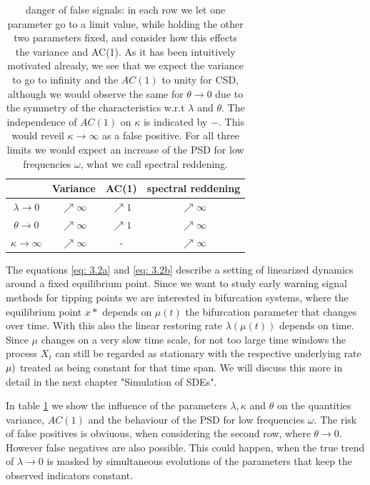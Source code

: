 \documentclass[%
thesis=student,%
coverpage=false,%
titlepage=false,%
headmarks=true, %
german,%
font=libertine, %
math=newpxtx, %
BCOR=5mm,%
coverBCOR=11mm%
]{tumbook}
\begin{document}
\begin{table}[h!]
\centering
\begin{tabular}{|c|c|c|c|}
\hline
& Variance & AC(1) & spectral reddening\\
\hline
$\lambda \rightarrow 0$ & $\nearrow \infty$ & $\nearrow 1$ & $\nearrow \infty$\\
$\theta \rightarrow 0$  & $\nearrow \infty$ & $\nearrow 1$ & $\nearrow \infty$\\
$\kappa \rightarrow \infty$ & $\nearrow \infty$ & - & $\nearrow \infty$\\    
\hline
\end{tabular}
\caption{danger of false signals: in each row we let one parameter go to a limit value, while holding the other two parameters fixed, and consider how this effects the variance and AC(1). As it has been intuitively motivated already, we see that we expect the variance to go to infinity and the $AC(1)$ to unity for CSD, although we would observe the same for $\theta \rightarrow 0$ due to the symmetry of the characteristics w.r.t $\lambda$ and $\theta$. The independence of $AC(1)$ on $\kappa$ is indicated by $-$. This would reveil $\kappa \rightarrow \infty$ as a false positive. For all three limits we would expect an increase of the PSD for low frequencies $\omega$, what we call spectral reddening.}
\label{tab:danger_of_false_signals}
\end{table}

The equations \ref{eq: 3.2a} and \ref{eq: 3.2b} describe a setting of linearized dynamics around a fixed equilibrium point. Since we want to study early warning signal methods for tipping points we are interested in bifurcation systems, where the equilibrium point $x*$ depends on $\mu(t)$ the bifurcation parameter that changes over time. With this also the linear restoring rate $\lambda(\mu(t))$ depends on time. Since $\mu$ changes on a very slow time scale, for not too large time windows the process $X_{t}$ can still be regarded as stationary with the respective underlying rate $\label(\mu)$ treated as being constant for that time span. We will discuss this more in detail in the next chapter "Simulation of SDEs".

In table \ref{tab:danger_of_false_signals} we show the influence of the parameters $\lambda, \kappa$ and $\theta$ on the quantities variance, $AC(1)$ and the behaviour of the PSD for low frequencies $\omega$. The risk of false positives is obviuous, when considering the second row, where $\theta \rightarrow 0$. However false negatives are also possible. This could happen, when the true trend of $\lambda \rightarrow 0$ is masked by simultaneous evolutions of the parameters that keep the observed indicators constant.
\end{document}
